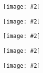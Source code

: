 \documentclass[landscape,a0b,final]{a0poster}
\newenvironment{poster}{
  \begin{center}
  \begin{minipage}[c]{0.98\textwidth}
}{
  \end{minipage} 
  \end{center}
}
\newcommand{\myfig}[3][0]{
\begin{center}
  \vspace{1.5cm}
  \texttt{[image: \#2]}
  \nobreak\medskip
\end{center}}
\newcommand{\mycaption}[1]{
  \vspace{0.5cm}
  \begin{quote}
    {{\sc Fig.} \arabic{figure}: #1}
  \end{quote}
  \vspace{1cm}
  \stepcounter{figure}
}
\begin{document}
\begin{poster}
\begin{multicols}{3}
\begin{multicols}{2}
  \begin{center}
  \myfig{c_spectrum_350_2_36_2_lowin.ps}{1.0}
  \end{center}
  \end{multicols}
  \vspace{-4.0cm}
  \setlength{\columnsep}{0pt}
  \setlength{\columnseprule}{0pt}
  \hspace{-2cm}
  \begin{multicols}{2}
  \begin{center}
  \myfig{c_spectrum_375_2_36_2_highin.ps}{1.0}
  \end{center}

  \begin{center}
  \myfig{c_spectrum_375_2_36_2_lowin.ps}{1.0}
  \end{center}
  \end{multicols}

  \vspace{-4.0cm}
  \setlength{\columnsep}{0pt}
  \setlength{\columnseprule}{0pt}
  \hspace{-2cm}
  \begin{multicols}{2}
  \begin{center}
  \myfig{c_spectrum_350_3_34_3_highin.ps}{1.0}
  \end{center}

  \begin{center}
  \myfig{c_spectrum_350_4_32_4_highin.ps}{1.0}
  \end{center}
  \end{multicols}






\end{multicols}
\end{poster}
\end{document}
